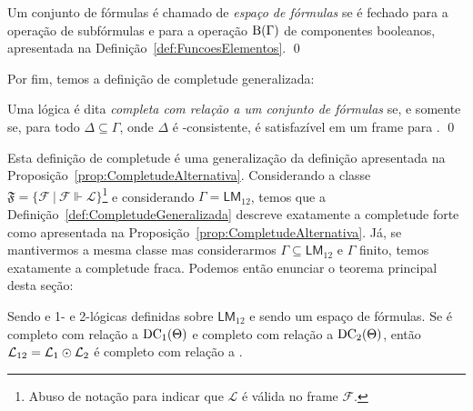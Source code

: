             \begin{definicao}
                \label{def:EspacoFormula}
                Um conjunto de fórmulas \THETA é chamado de \textit{espaço de fórmulas} se \THETA é fechado para a operação de subfórmulas e para a
                operação \(\operatorname{B}(\Gamma)\) de componentes booleanos, apresentada na Definição~\ref{def:FuncoesElementos}. \qed
            \end{definicao}

            Por fim, temos a definição de completude generalizada:

            \begin{definicao}
                \label{def:CompletudeGeneralizada}
                Uma lógica  é dita \textit{completa com relação a um conjunto de fórmulas \GAMMA} se, e somente se, para todo \(\Delta \subseteq \Gamma\),
                onde \(\Delta\) é -consistente, \DDELTA é satisfazível em um frame para . \qed
            \end{definicao}

            Esta definição de completude é uma generalização da definição apresentada na Proposição~\ref{prop:CompletudeAlternativa}.
            Considerando a classe \(\mathfrak{F} = \{\mathcal{F} \ | \ \mathcal{F} \Vdash \mathcal{L}\}\)\footnote{Abuso de notação para indicar que \(\mathcal{L}\) é válida no frame \(\mathcal{F}\).}
            e considerando \(\Gamma = \mathsf{LM}_{12}\), temos que a Definição~\ref{def:CompletudeGeneralizada} descreve exatamente a completude forte como apresentada
            na Proposição~\ref{prop:CompletudeAlternativa}. Já, se mantivermos a mesma classe  mas considerarmos \(\Gamma \subseteq \mathsf{LM}_{12}\) e \(\Gamma\) finito, temos
            exatamente a completude fraca. Podemos então enunciar o teorema principal desta seção:

            \begin{teorema}
                \label{teo:TransCompletude}
                Sendo  e  1- e 2-lógicas definidas sobre \(\mathsf{LM}_{12}\) e sendo \THETA um espaço de fórmulas.
                Se  é completo com relação a \(\operatorname{DC}_1(\Theta)\) e  completo com relação a \(\operatorname{DC}_2(\Theta)\), então
                \(\mathcal{L}_{12} = \mathcal{L}_1 \mathbin{\odot} \mathcal{L}_2\) é completo com relação a \THETA.
            \end{teorema}

